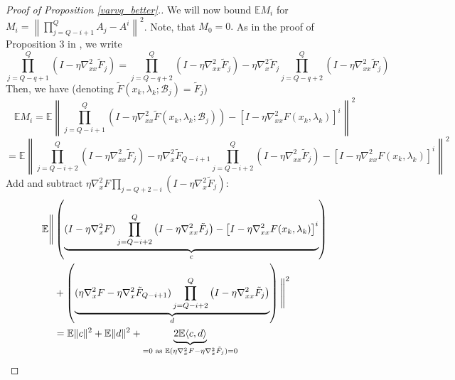 \documentclass[11pt, twoside]{report}
\begin{document}
\begin{proof}[Proof of Proposition \ref{varvq_better}.]


We will now bound $\mathbb{E}M_i$ for $M_i = \left\| \prod_{j = Q-i+1}^Q A_j - A^{i} \right \|^2$. Note, that $M_0 = 0.$ As in the proof of Proposition 3 in \cite{ji2021bilevel}, we write
 \[\prod_{j=Q-q + 1}^Q\left(I- \eta \nabla_{xx}^2 \tilde{F}_j\right) = \prod_{j=Q-q + 2}^Q \left(I- \eta \nabla_{xx}^2 \tilde{F}_j\right) - \eta \nabla_x^2 \tilde{F}_j\prod_{j=Q-q + 2}^Q\left(I- \eta \nabla_{xx}^2 \tilde{F}_j\right) \]
Then, we have (denoting $\tilde{F}\left(x_k, \lambda_k ; \mathcal{B}_j\right) = \tilde{F}_j$)
\[\mathbb{E} M_i = \mathbb{E} \left\| \prod_{j=Q-i+1}^Q\left(I- \eta \nabla_{xx}^2 \tilde{F}\left(x_k, \lambda_k ; \mathcal{B}_j\right)\right) -  \left[I - \eta\nabla_{xx}^2 F \left(x_k, \lambda_k\right)\right]^i \right\|^2\]
\[ = \mathbb{E} \left\| \prod_{j=Q-i + 2}^Q \left(I- \eta \nabla_{xx}^2 \tilde{F}_j\right) - \eta \nabla_x^2 \tilde{F}_{Q-i+1}\prod_{j=Q-i + 2}^Q\left(I- \eta \nabla_{xx}^2 \tilde{F}_j\right) - \left[I - \eta\nabla_{xx}^2 F \left(x_k, \lambda_k\right)\right]^i \right\|^2\]
Add and subtract $\eta \nabla_x^2 F \prod_{j = Q + 2 - i}(I - \eta \nabla_x^2 \tilde{F}_j)$:
\begin{align}
    \mathbb{E} \Bigg\| 
    &\left( \underbrace{(I - \eta \nabla_x^2 F) 
    \prod_{j=Q - i + 2}^Q \left(I - \eta \nabla_{xx}^2 \tilde{F}_j\right) 
    - \left[I - \eta \nabla_{xx}^2 F(x_k, \lambda_k)\right]^i}_{c} \right) \notag \\
    &+ \left( \underbrace{
    (\eta \nabla_x^2 F - \eta \nabla_x^2 \tilde{F}_{Q - i + 1}) 
    \prod_{j=Q - i + 2}^Q \left(I - \eta \nabla_{xx}^2 \tilde{F}_j\right)
    }_{d} \right)
    \Bigg\|^2 \\
    &=\mathbb{E}\|c\|^2 + \mathbb{E}\|d\|^2 + \underbrace{2\mathbb{E}\langle c,d \rangle}_{=0 \text{ as } \mathbb{E}(\eta \nabla_x^2 F - \eta \nabla_x^2 \tilde{F}_j) = 0}
\end{align}

\end{proof}
\end{document}
